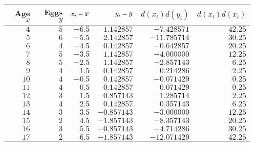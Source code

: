 \begin{tabular}{rrrrrr}                                                               \toprule
Age $x$ & Eggs $y$ & $x_i - \overline{x}$ & $y_i - \overline{y}$ & $d(x_i)d(y_i)$ & $d(x_i)d(x_i)$ \\\midrule
$4$     & $5$      & $-6.5$        & $1.142857$    & $-7.428571$   & $42.25$        \\[4pt]
$5$     & $6$      & $-5.5$        & $2.142857$    & $-11.785714$  & $30.25$        \\[4pt]
$6$     & $4$      & $-4.5$        & $0.142857$    & $-0.642857$   & $20.25$        \\[4pt]
$7$     & $5$      & $-3.5$        & $1.142857$    & $-4.000000$   & $12.25$        \\[4pt]
$8$     & $5$      & $-2.5$        & $1.142857$    & $-2.857143$   & $6.25$         \\[4pt]
$9$     & $4$      & $-1.5$        & $0.142857$    & $-0.214286$   & $2.25$         \\[4pt]
$10$    & $4$      & $-0.5$        & $0.142857$    & $-0.071429$   & $0.25$         \\[4pt]
$11$    & $4$      & $0.5$         & $0.142857$    & $0.071429$    & $0.25$         \\[4pt]
$12$    & $3$      & $1.5$         & $-0.857143$   & $-1.285714$   & $2.25$         \\[4pt]
$13$    & $4$      & $2.5$         & $0.142857$    & $0.357143$    & $6.25$         \\[4pt]
$14$    & $3$      & $3.5$         & $-0.857143$   & $-3.000000$   & $12.25$        \\[4pt]
$15$    & $2$      & $4.5$         & $-1.857143$   & $-8.357143$   & $20.25$        \\[4pt]
$16$    & $3$      & $5.5$         & $-0.857143$   & $-4.714286$   & $30.25$        \\[4pt]
$17$    & $2$      & $6.5$         & $-1.857143$   & $-12.071429$  & $42.25$        \\\bottomrule
\end{tabular}
